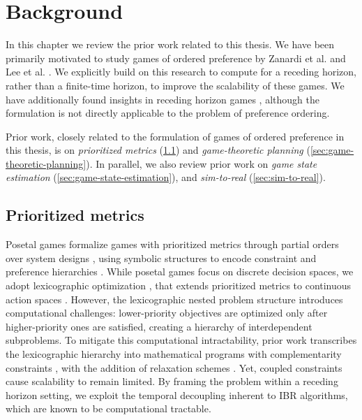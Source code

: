 \chapter{Background}
\label{ch:background}

In this chapter we review the prior work related to this thesis.
We have been primarily motivated
to study games of ordered preference
by Zanardi et al. \cite{zanardi:2022} and Lee et al. \cite{lee:2025}.
We explicitly build on this research
to compute for a receding horizon,
rather than a finite-time horizon,
to improve the scalability of these games.
We have additionally found insights in receding horizon games
\cite{hall:2022,hall:2024}, although the formulation is not directly applicable
to the problem of preference ordering.

Prior work, closely related to the formulation
of games of ordered preference in this thesis,
is on \emph{prioritized metrics} (\cref{sec:prioritized-metrics}) 
and \emph{game-theoretic planning} (\cref{sec:game-theoretic-planning}).
In parallel, we also review prior work on \emph{game state estimation} (\cref{sec:game-state-estimation}),
and \emph{sim-to-real} (\cref{sec:sim-to-real}).

\section{Prioritized metrics}
\label{sec:prioritized-metrics}
Posetal games \cite{zanardi:2022} formalize games
with prioritized metrics
through partial orders over system designs \cite{censi:2019}, using symbolic structures to encode constraint and preference hierarchies \cite{wongpiromsarn:2021}.
While posetal games focus
on discrete decision spaces, we adopt lexicographic optimization \cite{penlington:2024},
that extends prioritized metrics to continuous action spaces \cite{lee:2025}.
However, the lexicographic nested problem structure introduces computational challenges: lower-priority objectives are optimized only after higher-priority ones are satisfied, creating a hierarchy of interdependent subproblems. To mitigate this computational intractability, prior work transcribes the lexicographic hierarchy into mathematical programs with complementarity constraints \cite{nurkanovic:2024}, with the addition of relaxation schemes \cite{lee:2025}.
Yet, coupled constraints cause scalability to remain limited.
By framing the problem
within a receding horizon setting, we exploit the temporal decoupling inherent
to IBR algorithms, which are known to be computational tractable.

